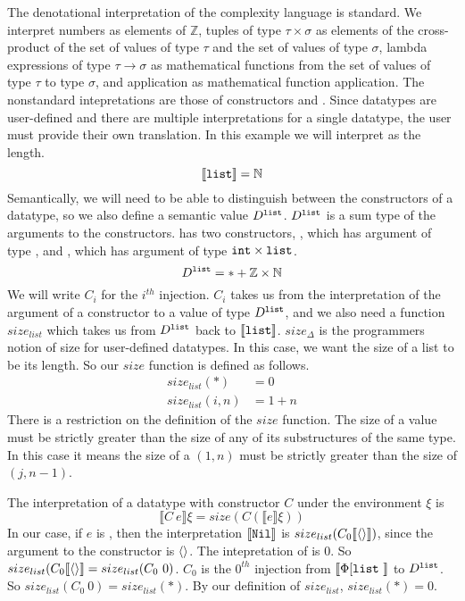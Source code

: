 The denotational interpretation of the complexity language is standard. We
interpret numbers as elements of $\mathbb{Z}$, tuples of type $\tau \times
\sigma$ as elements of the cross-product of the set of values of type $\tau$
and the set of values of type $\sigma$, lambda expressions of type $\tau \to
\sigma$ as mathematical functions from the set of values of type $\tau$ to type
$\sigma$, and application as mathematical function application. The nonstandard
intepretations are those of constructors and . Since datatypes are
user-defined and there are multiple interpretations for a single datatype, the
user must provide their own translation. In this example we will interpret
 as the length.
%
\[
  \llbracket \texttt{list} \rrbracket = \mathbb{N}
\]
%
Semantically, we will need to be able to distinguish between the constructors
of a datatype, so we also define a semantic value $D^{\texttt{list}}$. $D^{\texttt{list}}$ is
a sum type of the arguments to the  constructors.  has two
constructors, , which has argument of type , and , which
has argument of type $\texttt{int} \times \texttt{list}$.
%
\[
  D^{\texttt{list}} = \ast + \mathbb{Z} \times \mathbb{N}
\]
%
We will write $C_i$ for the $i^{th}$ injection. $C_i$ takes us from the
interpretation of the argument of a constructor to a value of type
$D^{\texttt{list}}$, and we also need a function $size_{list}$ which takes us from
$D^{\texttt{list}}$ back to $\llbracket \texttt{list} \rrbracket$. $size_\Delta$ is the
programmers notion of size for user-defined datatypes. In this case, we want
the size of a list to be its length. So our $size$ function is defined as follows.
%
\begin{align*}
  size_{list} (\ast) &= 0 \\
  size_{list}(i,n) &= 1 + n
\end{align*}
%
There is a restriction on the definition of the $size$ function. The size of a
value must be strictly greater than the size of any of its substructures of the
same type. In this case it means the size of a $(1, n)$ must be strictly
greater than the size of $(j, n-1)$.

The interpretation of a datatype with constructor $C$ under the environment
$\xi$ is
%
\[
  \llbracket C\ e\rrbracket \xi = size(C (\llbracket e \rrbracket \xi))
\]
%
In our case, if $e$ is , then the interpretation $\llbracket \texttt{Nil}
\rrbracket$ is $size_{list}(C_0 \llbracket\langle\rangle\rrbracket)$, since the argument to the 
constructor is $\langle\rangle$. The intepretation of  is $0$. So
$size_{list}(C_0 \llbracket\langle\rangle\rrbracket = size_{list}(C_0\ 0)$. $C_0$ is the $0^{th}$
injection from $\llbracket \Phi[\texttt{list}\ \rrbracket$ to $D^{\texttt{list}}$.  So
$size_{list}(C_0\ 0) = size_{list}(\ast)$. By our definition of
$size_{list}$, $size_{list}(\ast) = 0$.



